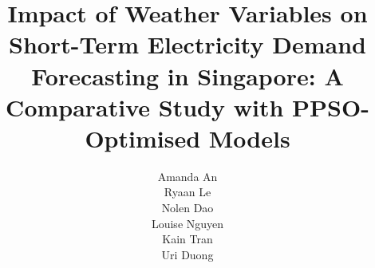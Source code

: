 \documentclass{template}
\begin{document}

\title{\huge{Impact of Weather Variables on Short-Term Electricity Demand Forecasting in Singapore: A Comparative Study with PPSO-Optimised Models}}
\author{Amanda An \\ Ryaan Le \\ Nolen Dao \\ Louise Nguyen \\ Kain Tran \\ Uri Duong}

\makeatletter
\def\declpage{%
\prefacesection{Declaration of Contributions}
    We confirm that the work contained in this group project report has been
    composed solely by the members of our group and has not been accepted in
    any previous application for a degree. All sources of information have
    been specifically acknowledged and all verbatim extracts are
    distinguished by quotation marks.

    The contribution of each member is declared as follows:

    \begin{table}[H]
    \centering
    \begin{tabular}{@{}p{3.2cm}p{8.6cm}c@{}}
    \toprule
    \textbf{Member} & \textbf{Contribution} & \textbf{Share} \\
    \midrule
    \dotfill & Data acquisition \& cleaning (EMA demand parsing, Open-Meteo integration, data validation tools) & 16.7\% \\
    \addlinespace
    \dotfill & Feature engineering \& EDA (CCI index, lag/rolling features, exploratory visualisations) & 16.7\% \\
    \addlinespace
    \dotfill & Model development (baseline, Linear Regression, Random Forest, XGBoost, CatBoost) & 16.7\% \\
    \addlinespace
    \dotfill & PPSO optimiser implementation \& fair-tuning experiment design & 16.7\% \\
    \addlinespace
    \dotfill & Web portal (FastAPI backend, React frontend, deployment) & 16.7\% \\
    \addlinespace
    \dotfill & Evaluation, analysis \& report writing (metrics, figures, LaTeX) & 16.7\% \\
    \bottomrule
    \end{tabular}
    \end{table}

    \vskip 0.4in
    Signed (all members) \dotfill \hspace{0.2in} Date \dotfill
\vfill}
\makeatother

\beforeabstract
\afterabstract








\footnotesize
\printbibliography
\normalsize
\end{document}

